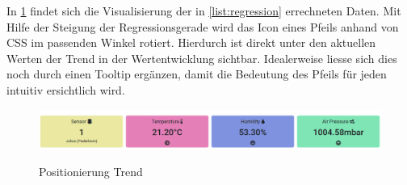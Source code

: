 In \cref{fig:posTrend} findet sich die Visualisierung der in \cref{list:regression} errechneten Daten.
Mit Hilfe der Steigung der Regressionsgerade wird das Icon eines Pfeils anhand von CSS im passenden Winkel rotiert.
Hierdurch ist direkt unter den aktuellen Werten der Trend in der Wertentwicklung sichtbar.
Idealerweise liesse sich dies noch durch einen Tooltip ergänzen, damit die Bedeutung des Pfeils für jeden intuitiv ersichtlich wird.

\begin{figure}[h!!]
    \centering
    \begin{minipage}[t]{1\textwidth}
        \caption{Positionierung Trend}
        \includegraphics[width=1\textwidth]{img/konzept-trend.png}\\
        \label{fig:posTrend}
    \end{minipage}
\end{figure}

